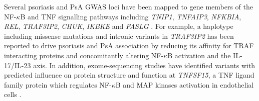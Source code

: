 Several psoriasis and PsA GWAS loci have been mapped to gene members of the NF-$\kappa$B and TNF signalling pathways including \textit{TNIP1}, \textit{TNFAIP3}, \textit{NFKBIA}, \textit{REL}, \textit{TRAF3IP2}, \textit{CHUK}, \textit{IKBKE} and \textit{FASLG} \parencite{Nair2008, Ellinghaus2010, Huffmeier2010, Wang2008, Idel2003, Bowes2012, Tsoi2017}. 
For example, a haplotype including missense mutations and intronic variants in \textit{TRAF3IP2} has been reported to drive psoriasis and PsA association by reducing its affinity for TRAF interacting proteins and concomitantly altering NF-$\kappa$B activation and the IL-17/IL-23 axis\parencite{Huffmeier2010, Ellinghaus2010}. In addition, exome-sequencing studies have identified variants with predicted influence on protein structure and function at \textit{TNFSF15}, a TNF ligand family protein which regulates NF-$\kappa$B and MAP kinases activation in endothelial cells \parencite{Dand2017, Wang2014}.





